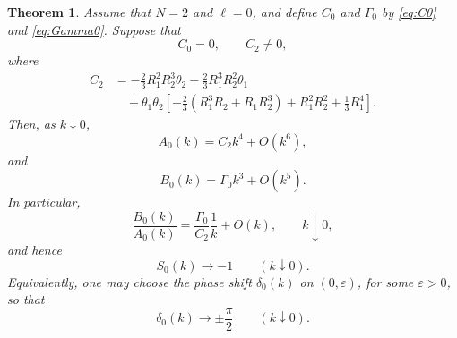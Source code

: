 \documentclass[a4paper,11pt]{article}
\numberwithin{equation}{section}
\newtheorem{thm}{Theorem}[section]
\theoremstyle{definition}
\theoremstyle{remark}
\begin{document}
\begin{thm}
\label{thm:exceptional-threshold}
Assume that $N=2$ and $\ell=0$, and define $C_0$ and $\Gamma_0$ by
\eqref{eq:C0} and \eqref{eq:Gamma0}. Suppose that
\[
C_0=0,
\qquad
C_2\neq0,
\]
where
\begin{align}
C_2
&=
-\frac23 R_1^2R_2^3\theta_2
-\frac23 R_1^3R_2^2\theta_1
\nonumber\\
&\quad
+
\theta_1\theta_2
\left[
-\frac23(R_1^3R_2+R_1R_2^3)
+R_1^2R_2^2+\frac13 R_1^4
\right].
\label{eq:C2}
\end{align}
Then, as $k\downarrow0$,
\begin{equation}\label{eq:A0-exceptional}
A_0(k)=C_2 k^4+O(k^6),
\end{equation}
and
\begin{equation}\label{eq:B0-exceptional}
B_0(k)=\Gamma_0 k^3+O(k^5).
\end{equation}
In particular,
\begin{equation}\label{eq:BA-exceptional}
\frac{B_0(k)}{A_0(k)}
=
\frac{\Gamma_0}{C_2}\frac{1}{k}
+O(k),
\qquad k\downarrow0,
\end{equation}
and hence
\begin{equation}\label{eq:S0-exceptional}
S_0(k)\to -1
\qquad (k\downarrow0).
\end{equation}
Equivalently, one may choose the phase shift $\delta_0(k)$ on
$(0,\varepsilon)$, for some $\varepsilon>0$, so that
\begin{equation}\label{eq:delta-exceptional}
\delta_0(k)\to \pm \frac{\pi}{2}
\qquad (k\downarrow0).
\end{equation}
\end{thm}
\end{document}

